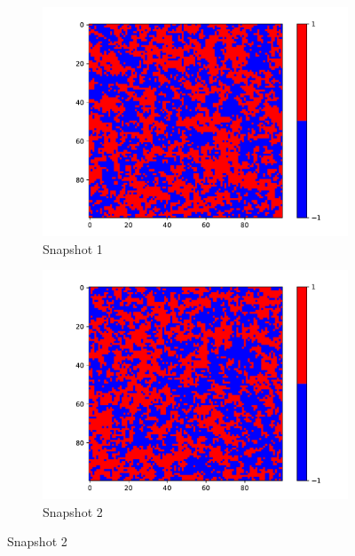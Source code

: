   \begin{figure}
    \centering
    \begin{subfigure}{0.45\textwidth}
      \centering
      \includegraphics[width=\linewidth]{images/Ising3_0.pdf}
      \caption{Snapshot 1}
      \label{fig:image1}
    \end{subfigure}
    \hfill
    \begin{subfigure}{0.45\textwidth}
      \centering
      \includegraphics[width=\linewidth]{images/Ising3_2.pdf}
      \caption{Snapshot 2}
      \label{fig:image2}
    \end{subfigure}
    
    \vspace{0.5cm}
    

\end{figure}
